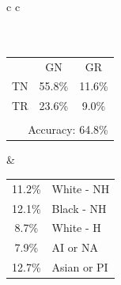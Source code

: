 \documentclass[sigconf]{acmart}
\begin{document}
\begin{figure}
    \begin{tabular}{c c}
    \vspace{3mm} \\
     \\
    \vspace{-2mm} \\
    \begin{tabular}{c c c}
      & GN & GR \\ \cline{2-3}
      TN & \multicolumn{1}{|c|}{55.8\%} & \multicolumn{1}{|c|}{11.6\%} \\ \cline{2-3}
      TR & \multicolumn{1}{|c|}{23.6\%} & \multicolumn{1}{|c|}{9.0\%} \\ \cline{2-3}
       & & \vspace{-2mm} \\
      \multicolumn{3}{r}{Accuracy: 64.8\%} \\
    \end{tabular} & 
    \begin{tabular}{|c l|}
      \hline
      11.2\% & White - NH \\
      12.1\% & Black - NH \\
      8.7\% & White - H \\
      7.9\% & AI or NA \\
      12.7\% & Asian or PI \\
      \hline
    \end{tabular} \\
  \end{tabular}


\end{figure}
\end{document}
